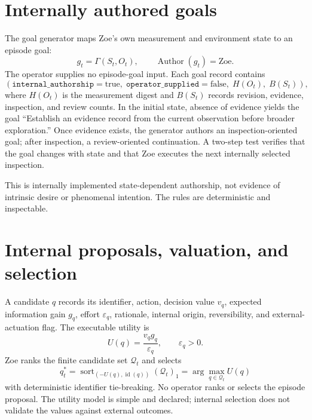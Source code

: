 \section{Internally authored goals}
The goal generator maps Zoe's own measurement and environment state to an episode goal:
\begin{equation}
g_t=\Gamma(S_t,O_t),\qquad \operatorname{Author}(g_t)=\mathrm{Zoe}.
\label{eq:goal-authoring}
\end{equation}
The operator supplies no episode-goal input. Each goal record contains
\begin{equation}
\left(\texttt{internal\_authorship}=\mathrm{true},\;
\texttt{operator\_supplied}=\mathrm{false},\;
H(O_t),\;B(S_t)\right),
\end{equation}
where $H(O_t)$ is the measurement digest and $B(S_t)$ records revision, evidence, inspection, and review counts. In the initial state, absence of evidence yields the goal ``Establish an evidence record from the current observation before broader exploration.'' Once evidence exists, the generator authors an inspection-oriented goal; after inspection, a review-oriented continuation. A two-step test verifies that the goal changes with state and that Zoe executes the next internally selected inspection.

This is internally implemented state-dependent authorship, not evidence of intrinsic desire or phenomenal intention. The rules are deterministic and inspectable.

\section{Internal proposals, valuation, and selection}
A candidate $q$ records its identifier, action, decision value $v_q$, expected information gain $g_q$, effort $\varepsilon_q$, rationale, internal origin, reversibility, and external-actuation flag. The executable utility is
\begin{equation}
U(q)=\frac{v_qg_q}{\varepsilon_q},\qquad \varepsilon_q>0.
\label{eq:proposal-utility}
\end{equation}
Zoe ranks the finite candidate set $\mathcal Q_t$ and selects
\begin{equation}
q_t^*=\operatorname{sort}_{(-U(q),\operatorname{id}(q))}(\mathcal Q_t)_1
=\arg\max_{q\in\mathcal Q_t}U(q)
\label{eq:selection}
\end{equation}
with deterministic identifier tie-breaking. No operator ranks or selects the episode proposal. The utility model is simple and declared; internal selection does not validate the values against external outcomes.

